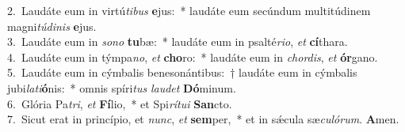 {2.~}Laudáte eum in virtú\textit{ti}\textit{bus} \textbf{e}jus:~* laudáte eum secúndum multitúdinem magni\textit{tú}\textit{di}\textit{nis} \textbf{e}jus.\\
{3.~}Laudáte eum in \textit{so}\textit{no} \textbf{tu}bæ:~* laudáte eum in psalté\textit{ri}\textit{o}, \textit{et} \textbf{cí}thara.\\
{4.~}Laudáte eum in týmpa\textit{no}, \textit{et} \textbf{cho}ro:~* laudáte eum in \textit{chor}\textit{dis}, \textit{et} \textbf{ór}gano.\\
{5.~}Laudáte eum in cýmbalis benesonántibus:~† laudáte eum in cýmbalis jubi\textit{la}\textit{ti}\textbf{ó}nis:~* omnis spíri\textit{tus} \textit{lau}\textit{det} \textbf{Dó}minum.\\
{6.~}Glória Pa\textit{tri}, \textit{et} \textbf{Fí}lio,~* et Spi\textit{rí}\textit{tu}\textit{i} \textbf{San}cto.\\
{7.~}Sicut erat in princípio, et \textit{nunc}, \textit{et} \textbf{sem}per,~* et in sǽcula sæ\textit{cu}\textit{ló}\textit{rum}. \textbf{A}men.\\

